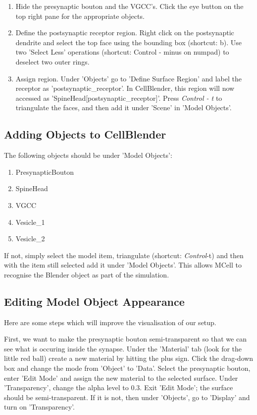 \documentclass[twoside,a4paper]{refart}
\begin{document}
\begin{enumerate}
\item   Hide the presynaptic bouton and the VGCC's. Click the eye button on the top right pane for the appropriate objects.

\item   Define the postsynaptic receptor region. Right click on the postsynaptic dendrite and select the top face using the bounding box (shortcut: b). Use two 'Select Less' operations (shortcut: Control - minus on numpad) to deselect two outer rings. 

\item   Assign region. Under 'Objects' go to 'Define Surface Region' and label the receptor as 'postsynaptic\_receptor'. In CellBlender, this region will now accessed as 'SpineHead[postsynaptic\_receptor]'. Press \textit{Control - t} to triangulate the faces, and then add it under 'Scene' in 'Model Objects'.

\end{enumerate}

\subsection{Adding Objects to CellBlender}
The following objects should be under 'Model Objects':

\begin{enumerate}
    \item PresynapticBouton
    \item SpineHead
    \item VGCC
    \item Vesicle\_1
    \item Vesicle\_2
\end{enumerate}

If not, simply select the model item, triangulate (shortcut: \textit{Control}-t) and then with the item still selected add it under 'Model Objects'. This allows MCell to recognise the Blender object as part of the simulation.

\subsection{Editing Model Object Appearance} %
\label{sub:Editing Model Object Appearance}

Here are some steps which will improve the visualisation of our setup.

First, we want to make the presynaptic bouton semi-transparent so that we can see what is occuring inside the synapse. Under the 'Material' tab (look for the little red ball) create a new material by hitting the plus sign. Click the drag-down box and change the mode from 'Object' to 'Data'. Select the presynaptic bouton, enter 'Edit Mode' and assign the new material to the selected surface. Under 'Transparency', change the alpha level to 0.3. Exit 'Edit Mode'; the surface should be semi-transparent. If it is not, then under 'Objects', go to 'Display' and turn on 'Transparency'.
\end{document}
